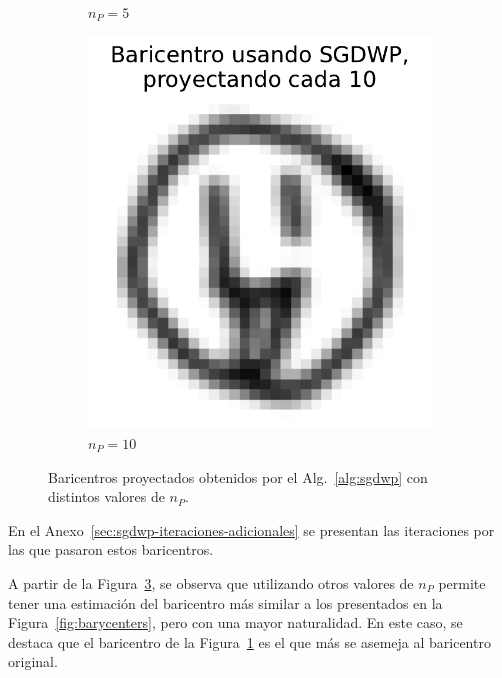 \begin{figure}[htbp]
\begin{subfigure}[b]{0.23\textwidth}
        \caption{$n_P=5$}
        \label{fig:bar-SGDWP-pe-05}
    \end{subfigure}
    \hfill
    \begin{subfigure}[b]{0.23\textwidth}
        \centering
        \includegraphics[width=\textwidth]{img/sgdwp-pe/bar-SGDWP-pe-10.pdf}
        \caption{$n_P=10$}
        \label{fig:bar-SGDWP-pe-10}
    \end{subfigure}
    \caption{Baricentros proyectados obtenidos por el Alg.~\ref{alg:sgdwp} con distintos valores de $n_P$.}
    \label{fig:bar-SGDWP-pe}
\end{figure}

En el Anexo~\ref{sec:sgdwp-iteraciones-adicionales} se presentan las iteraciones por las que pasaron estos baricentros.

A partir de la Figura~\ref{fig:bar-SGDWP-pe}, se observa que utilizando otros valores de $n_P$ permite tener una estimación del baricentro más similar a los presentados en la Figura~\ref{fig:barycenters}, pero con una mayor naturalidad. En este caso, se destaca que el baricentro de la Figura~\ref{fig:bar-SGDWP-pe-05} es el que más se asemeja al baricentro original.


